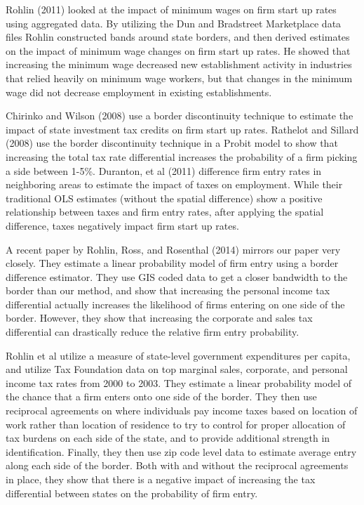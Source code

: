 \documentclass[12pt,a4paper]{article}
\begin{document}
Rohlin (2011) looked at the impact of minimum wages on firm start up rates using aggregated data. By utilizing the Dun and Bradstreet Marketplace data files Rohlin constructed bands around state borders, and then derived estimates on the impact of minimum wage changes on firm start up rates. He showed that increasing the minimum wage decreased new establishment activity in industries that relied heavily on minimum wage workers, but that changes in the minimum wage did not decrease employment in existing establishments. 

Chirinko and Wilson (2008) use a border discontinuity technique to estimate the impact of state investment tax credits on firm start up rates. Rathelot and Sillard (2008) use the border discontinuity technique in a Probit model to show that increasing the total tax rate differential increases the probability of a firm picking a side between 1-5\%. Duranton, et al (2011)  difference firm entry rates in neighboring areas to estimate the impact of taxes on employment. While their  traditional OLS estimates (without the spatial difference)  show a positive relationship between taxes and firm entry rates, after applying the spatial difference, taxes negatively impact firm start up rates. 

A recent paper by Rohlin, Ross, and Rosenthal (2014) mirrors our paper very closely. They estimate a linear probability model of firm entry using a border difference estimator. They use GIS coded data to get a closer bandwidth to the border than our method, and show that increasing the personal income tax differential actually increases the likelihood of firms entering on one side of the border. However, they show that increasing the corporate and sales tax differential can drastically reduce the relative firm entry probability.

Rohlin et al utilize a measure of state-level government expenditures per capita, and utilize Tax Foundation data on top marginal sales, corporate, and personal income tax rates from 2000 to 2003. They estimate a linear probability model of the chance that a firm enters onto one side of the border. They then use reciprocal agreements on where individuals pay income taxes based on location of work rather than location of residence to try to control for proper allocation of tax burdens on each side of the state, and to provide additional strength in identification. Finally, they then use zip code level data to estimate average entry along each side of the border. Both with and without the reciprocal agreements in place, they show that there is a negative impact of increasing the tax differential between states on the probability of firm entry.
\end{document}
